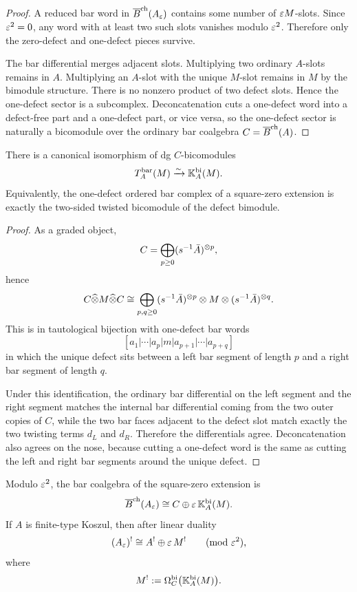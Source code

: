 \begin{proof}
A reduced bar word in $\overline{B}^{\mathrm{ch}}(A_\varepsilon)$ contains some number of $\varepsilon M$-slots.
Since $\varepsilon^2=0$, any word with at least two such slots vanishes modulo $\varepsilon^2$.
Therefore only the zero-defect and one-defect pieces survive.

The bar differential merges adjacent slots. Multiplying two ordinary $A$-slots remains in $A$.
Multiplying an $A$-slot with the unique $M$-slot remains in $M$ by the bimodule structure.
There is no nonzero product of two defect slots. Hence the one-defect sector is a subcomplex.
Deconcatenation cuts a one-defect word into a defect-free part and a one-defect part, or vice versa,
so the one-defect sector is naturally a bicomodule over the ordinary bar coalgebra $C=\overline{B}^{\mathrm{ch}}(A)$.
\end{proof}

\begin{theorem}
There is a canonical isomorphism of dg $C$-bicomodules
\[
T_A^{\mathrm{bar}}(M)\xrightarrow{\sim}\mathbb{K}_A^{\mathrm{bi}}(M).
\]
Equivalently, the one-defect ordered bar complex of a square-zero extension is exactly the two-sided
twisted bicomodule of the defect bimodule.
\end{theorem}

\begin{proof}
As a graded object,
\[
C=\bigoplus_{p\geq 0} (s^{-1}\bar A)^{\otimes p},
\]
hence
\[
C\widehat\otimes M\widehat\otimes C
\cong
\bigoplus_{p,q\geq 0}
(s^{-1}\bar A)^{\otimes p}\otimes M\otimes(s^{-1}\bar A)^{\otimes q}.
\]
This is in tautological bijection with one-defect bar words
\[
[a_1|\cdots|a_p|m|a_{p+1}|\cdots|a_{p+q}]
\]
in which the unique defect sits between a left bar segment of length $p$ and a right bar segment of
length $q$.

Under this identification, the ordinary bar differential on the left segment and the right segment
matches the internal bar differential coming from the two outer copies of $C$, while the two bar
faces adjacent to the defect slot match exactly the two twisting terms $d_L$ and $d_R$.
Therefore the differentials agree. Deconcatenation also agrees on the nose, because cutting a
one-defect word is the same as cutting the left and right bar segments around the unique defect.
\end{proof}

\begin{corollary}
Modulo $\varepsilon^2$, the bar coalgebra of the square-zero extension is
\[
\overline{B}^{\mathrm{ch}}(A_\varepsilon)\cong C\oplus \varepsilon\,\mathbb{K}_A^{\mathrm{bi}}(M).
\]
If $A$ is finite-type Koszul, then after linear duality
\[
(A_\varepsilon)^!\cong A^!\oplus \varepsilon\, M^!
\qquad (\mathrm{mod}\ \varepsilon^2),
\]
where
\[
M^!:=\Omega_C^{\mathrm{bi}}\bigl(\mathbb{K}_A^{\mathrm{bi}}(M)\bigr).
\]
\end{corollary}

